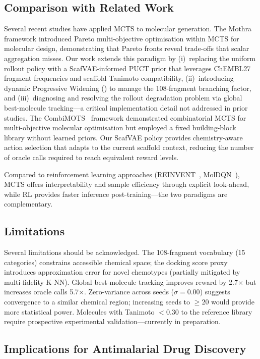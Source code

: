 \documentclass[jcim,article,layout=manuscript]{achemso}
\begin{document}
\subsection{Comparison with Related Work}

Several recent studies have applied MCTS to molecular generation. The
Mothra~\cite{Mothra2024} framework introduced Pareto multi-objective
optimisation within MCTS for molecular design, demonstrating that
Pareto fronts reveal trade-offs that scalar aggregation misses. Our work
extends this paradigm by (i)~replacing the uniform rollout policy with
a ScafVAE-informed PUCT prior that leverages ChEMBL27 fragment frequencies
and scaffold Tanimoto compatibility, (ii)~introducing dynamic Progressive
Widening () to manage the 108-fragment branching factor, and (iii)~diagnosing
and resolving the rollout degradation problem via global best-molecule
tracking---a critical implementation detail not addressed in prior studies.
The CombiMOTS~\cite{CombiMOTS2026} framework demonstrated combinatorial
MCTS for multi-objective molecular optimisation but employed a fixed
building-block library without learned priors. Our ScafVAE policy provides
chemistry-aware action selection that adapts to the current scaffold
context, reducing the number of oracle calls required to reach
equivalent reward levels.

Compared to reinforcement learning approaches (REINVENT~\cite{Olivecrona2017},
MolDQN~\cite{Zhou2019}), MCTS offers interpretability and sample efficiency
through explicit look-ahead, while RL provides faster inference
post-training---the two paradigms are complementary.
\subsection{Limitations}

Several limitations should be acknowledged. The 108-fragment vocabulary (15 categories)
constrains accessible chemical space; the docking score proxy introduces
approximation error for novel chemotypes (partially mitigated by multi-fidelity
K-NN). Global best-molecule tracking improves reward by 2.7$\times$ but increases
oracle calls 5.7$\times$. Zero-variance across seeds ($\sigma=0.00$) suggests
convergence to a similar chemical region; increasing seeds to $\geq 20$ would
provide more statistical power. Molecules with Tanimoto $<0.30$ to the reference
library require prospective experimental validation---currently in preparation.

\subsection{Implications for Antimalarial Drug Discovery}
\end{document}
